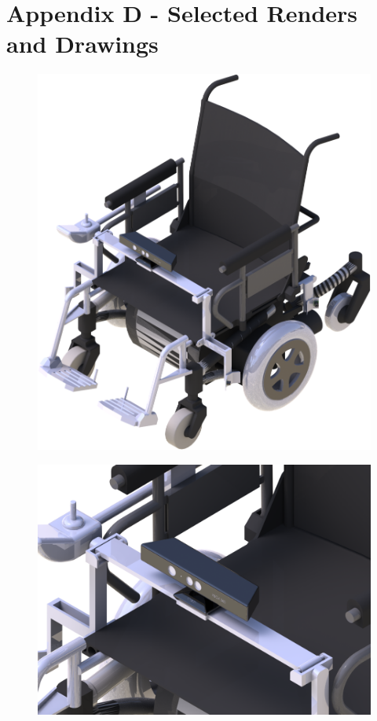 \documentclass[oneside,final,a4paper]{report}
\begin{document}
\chapter*{Appendix D - Selected Renders and Drawings}
\begin{figure}[hbt]
 \centering
 \includegraphics[scale=0.75]{BIG_RENDER}
\end{figure}
\begin{figure}[hbt]
 \centering
 \includegraphics[scale=0.75]{KINECT_RENDER}
\end{figure}
\end{document}
